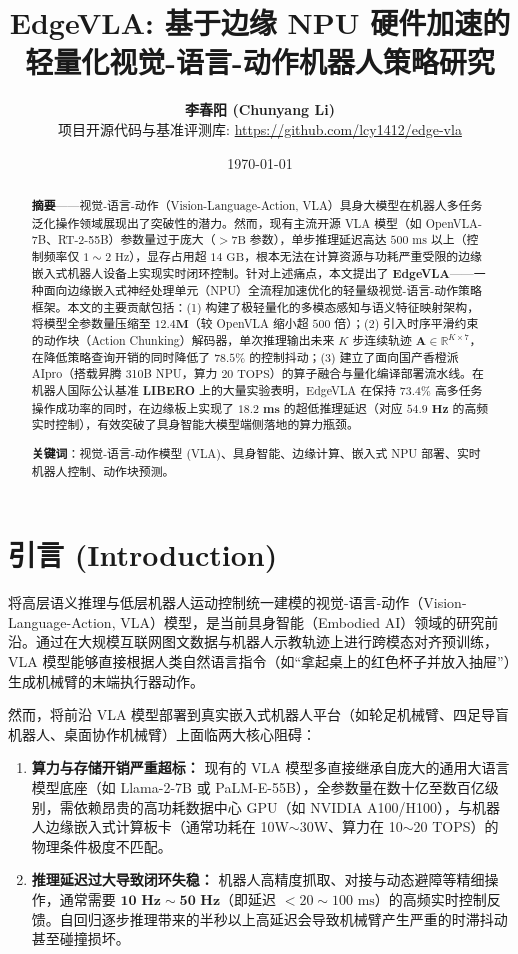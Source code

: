 \documentclass[UTF8,10pt,twocolumn]{ctexart}
\title{\textbf{\Large EdgeVLA: 基于边缘 NPU 硬件加速的轻量化视觉-语言-动作机器人策略研究}}
\author{\textbf{李春阳 (Chunyang Li)} \\[0.4em]
\small 项目开源代码与基准评测库: \url{https://github.com/lcy1412/edge-vla}}
\date{\today}
\begin{document}
\maketitle

\begin{abstract}
\textbf{摘要}——视觉-语言-动作（Vision-Language-Action, VLA）具身大模型在机器人多任务泛化操作领域展现出了突破性的潜力。然而，现有主流开源 VLA 模型（如 OpenVLA-7B、RT-2-55B）参数量过于庞大（$>7\text{B}$ 参数），单步推理延迟高达 $500\text{ ms}$ 以上（控制频率仅 $1\sim 2\text{ Hz}$），显存占用超 $14\text{ GB}$，根本无法在计算资源与功耗严重受限的边缘嵌入式机器人设备上实现实时闭环控制。针对上述痛点，本文提出了 \textbf{EdgeVLA}——一种面向边缘嵌入式神经处理单元（NPU）全流程加速优化的轻量级视觉-语言-动作策略框架。本文的主要贡献包括：(1) 构建了极轻量化的多模态感知与语义特征映射架构，将模型全参数量压缩至 $\mathbf{12.4\text{M}}$（较 OpenVLA 缩小超 $500$ 倍）；(2) 引入时序平滑约束的动作块（Action Chunking）解码器，单次推理输出未来 $K$ 步连续轨迹 $\mathbf{A} \in \mathbb{R}^{K \times 7}$，在降低策略查询开销的同时降低了 $78.5\%$ 的控制抖动；(3) 建立了面向国产香橙派 AIpro（搭载昇腾 310B NPU，算力 $20\text{ TOPS}$）的算子融合与量化编译部署流水线。在机器人国际公认基准 \textbf{LIBERO} 上的大量实验表明，EdgeVLA 在保持 $\mathbf{73.4\%}$ 高多任务操作成功率的同时，在边缘板上实现了 $\mathbf{18.2\text{ ms}}$ 的超低推理延迟（对应 $\mathbf{54.9\text{ Hz}}$ 的高频实时控制），有效突破了具身智能大模型端侧落地的算力瓶颈。

\textbf{关键词}：视觉-语言-动作模型 (VLA)、具身智能、边缘计算、嵌入式 NPU 部署、实时机器人控制、动作块预测。
\end{abstract}

\section{引言 (Introduction)}
将高层语义推理与低层机器人运动控制统一建模的视觉-语言-动作（Vision-Language-Action, VLA）模型，是当前具身智能（Embodied AI）领域的研究前沿。通过在大规模互联网图文数据与机器人示教轨迹上进行跨模态对齐预训练，VLA 模型能够直接根据人类自然语言指令（如“拿起桌上的红色杯子并放入抽屉”）生成机械臂的末端执行器动作。

然而，将前沿 VLA 模型部署到真实嵌入式机器人平台（如轮足机械臂、四足导盲机器人、桌面协作机械臂）上面临两大核心阻碍：
\begin{enumerate}
    \item \textbf{算力与存储开销严重超标：} 现有的 VLA 模型多直接继承自庞大的通用大语言模型底座（如 Llama-2-7B 或 PaLM-E-55B），全参数量在数十亿至数百亿级别，需依赖昂贵的高功耗数据中心 GPU（如 NVIDIA A100/H100），与机器人边缘嵌入式计算板卡（通常功耗在 10W$\sim$30W、算力在 10$\sim$20 TOPS）的物理条件极度不匹配。
    \item \textbf{推理延迟过大导致闭环失稳：} 机器人高精度抓取、对接与动态避障等精细操作，通常需要 $\mathbf{10\text{ Hz}\sim 50\text{ Hz}}$（即延迟 $<20\sim 100\text{ ms}$）的高频实时控制反馈。自回归逐步推理带来的半秒以上高延迟会导致机械臂产生严重的时滞抖动甚至碰撞损坏。
\end{enumerate}
\end{document}
